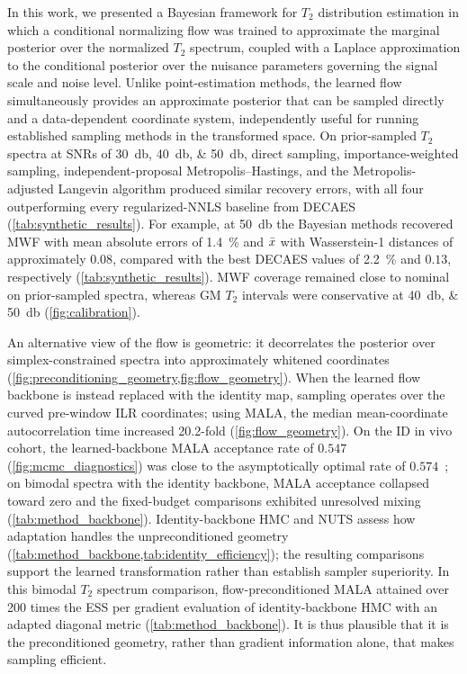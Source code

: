 In this work, we presented a Bayesian framework for $T_2$ distribution estimation in which a conditional normalizing flow was trained to approximate the marginal posterior over the normalized $T_2$ spectrum, coupled with a Laplace approximation to the conditional posterior over the nuisance parameters governing the signal scale and noise level.
Unlike point-estimation methods, the learned flow simultaneously provides an approximate posterior that can be sampled directly and a data-dependent coordinate system, independently useful for running established sampling methods in the transformed space.
On prior-sampled $T_2$ spectra at \gls*{SNR}s of \SIlist{30;40;50}{\decibel}, direct sampling, importance-weighted sampling, independent-proposal Metropolis--Hastings, and the Metropolis-adjusted Langevin algorithm produced similar recovery errors, with all four outperforming every regularized-\gls*{NNLS} baseline from \gls*{DECAES} (\cref{tab:synthetic_results}).
For example, at \SI{50}{\decibel} the Bayesian methods recovered \gls*{MWF} with mean absolute errors of \SI{1.4}{\percent} and $\bar{x}$ with Wasserstein-1 distances of approximately $0.08$, compared with the best \gls*{DECAES} values of \SI{2.2}{\percent} and $0.13$, respectively (\cref{tab:synthetic_results}).
\gls*{MWF} coverage remained close to nominal on prior-sampled spectra, whereas GM $T_2$ intervals were conservative at \SIlist{40;50}{\decibel} (\cref{fig:calibration}).

An alternative view of the flow is geometric:
it decorrelates the posterior over simplex-constrained spectra into approximately whitened coordinates (\cref{fig:preconditioning_geometry,fig:flow_geometry}).
When the learned flow backbone is instead replaced with the identity map, sampling operates over the curved pre-window \gls*{ILR} coordinates;
using \gls*{MALA}, the median mean-coordinate autocorrelation time increased \num{20.2}-fold (\cref{fig:flow_geometry}).
On the ID in vivo cohort, the learned-backbone \gls*{MALA} acceptance rate of $0.547$ (\cref{fig:mcmc_diagnostics}) was close to the asymptotically optimal rate of $0.574$~\citep{roberts_optimal_1998};
on bimodal spectra with the identity backbone, \gls*{MALA} acceptance collapsed toward zero and the fixed-budget comparisons exhibited unresolved mixing (\cref{tab:method_backbone}).
Identity-backbone \gls*{HMC} and \gls*{NUTS} assess how adaptation handles the unpreconditioned geometry (\cref{tab:method_backbone,tab:identity_efficiency});
the resulting comparisons support the learned transformation rather than establish sampler superiority.
In this bimodal $T_2$ spectrum comparison, flow-preconditioned \gls*{MALA} attained over \num{200} times the ESS per gradient evaluation of identity-backbone \gls*{HMC} with an adapted diagonal metric (\cref{tab:method_backbone}).
It is thus plausible that it is the preconditioned geometry, rather than gradient information alone, that makes sampling efficient.

